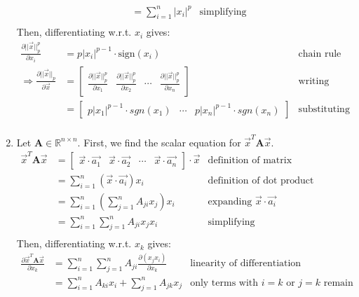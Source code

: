 \documentclass[11pt, fleqn]{article}
\newcommand{\pd}[2]{\frac{\partial #1}{\partial #2}}
\begin{document}
\begin{enumerate}
\begin{align*}
        &= \sum_{i=1}^{n} |x_i|^p & \text{simplifying} \\
    \end{align*}
    Then, differentiating w.r.t. $x_i$ gives:
    \begin{align*}
        \pd{||\vec{x}||_p^p}{x_i} &= p |x_i|^{p - 1} \cdot \text{sign}(x_i) & \text{chain rule} \\
        \Rightarrow \pd{||\vec{x}||_p}{\vec{x}} &= \begin{bmatrix}
            \pd{||\vec{x}||_p^p}{x_1} & \pd{||\vec{x}||_p^p}{x_2} & \cdots & \pd{||\vec{x}||_p^p}{x_n}
        \end{bmatrix} & \text{writing derivative in vector form} \\
        &= \begin{bmatrix}
            p |x_1|^{p - 1} \cdot sgn(x_1) & \cdots & p |x_n|^{p - 1} \cdot sgn(x_n)
        \end{bmatrix} & \text{substituting previous result} \\
    \end{align*}
    \item Let $\textbf{A} \in \mathbb{R}^{n \times n}$. First, we find the scalar equation for $\vec{x}^T \textbf{A} \vec{x}$.
    \begin{align*}
        \vec{x}^T \textbf{A} \vec{x} &= \begin{bmatrix}
            \vec{x} \cdot \vec{a_1} & \vec{x} \cdot \vec{a_2} & \cdots & \vec{x} \cdot \vec{a_n}
        \end{bmatrix} \cdot \vec{x} & \text{definition of matrix multiplication} \\
        &= \sum_{i=1}^{n} (\vec{x} \cdot \vec{a_i}) x_i & \text{definition of dot product} \\
        &= \sum_{i=1}^{n} \left( \sum_{j=1}^{n} A_{ji} x_j \right) x_i & \text{expanding } \vec{x} \cdot \vec{a_i} \\
        &= \sum_{i=1}^{n} \sum_{j=1}^{n} A_{ji} x_j x_i & \text{simplifying} \\
    \end{align*}
    Then, differentiating w.r.t. $x_k$ gives:
    \begin{align*}
        \pd{\vec{x}^T \textbf{A} \vec{x}}{x_k} &= \sum_{i=1}^{n} \sum_{j=1}^{n} A_{ji} \pd{(x_j x_i)}{x_k} & \text{linearity of differentiation} \\
        &= \sum_{i=1}^{n} A_{ki} x_i + \sum_{j=1}^{n} A_{jk} x_j & \text{only terms with } i = k \text{ or } j = k \text{ remain} \\

\end{align*}
\end{enumerate}
\end{document}
